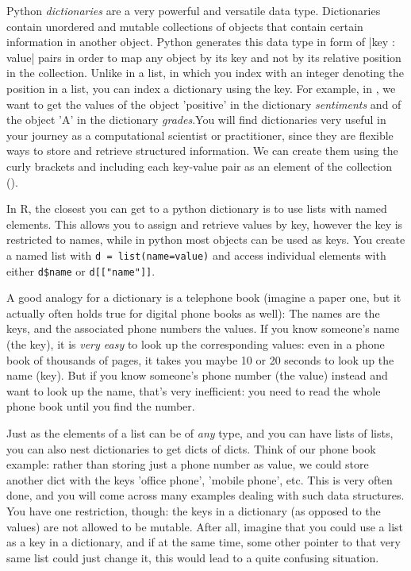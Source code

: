 Python \emph{dictionaries} are a very powerful and versatile data type.
Dictionaries contain unordered and mutable collections of objects that
contain certain information in another object. Python generates this
data type in form of |{key : value}| pairs in order
to map any object by its key and not by its relative position in the
collection. Unlike in a list, in which you index with an integer denoting
the position in a list, you can index a dictionary using the key.
For example, in , we want to get the values of the object 'positive' in the
dictionary \emph{sentiments} and of the object 'A' in the dictionary
\emph{grades}.You will
find dictionaries very useful in your journey as a computational
scientist or practitioner, since they are flexible ways to store and
retrieve structured information. We can create them using the curly
brackets {} and including each key-value pair as an element of the
collection ().

In R, the closest you can get to a python dictionary is to use lists with named elements.
This allows you to assign and retrieve values by key,
however the key is restricted to names, while in python most objects can be used as keys.
You create a named list with \verb|d = list(name=value)| and access individual elements with either
\verb|d$name| or \verb|d[["name"]]|. 


A good analogy for a dictionary is a telephone book (imagine a paper
one, but it actually often holds true for digital phone books as
well): The names are the keys, and the associated phone numbers the
values. If you know someone's name (the key), it is \emph{very easy}
to look up the corresponding values: even in a phone book of thousands
of pages, it takes you maybe 10 or 20 seconds to look up the name
(key). But if you know someone's phone number (the value) instead and
want to look up the name, that's very inefficient: you need to read
the whole phone book until you find the number.

Just as the elements of a list can be of \emph{any} type, and you can
have lists of lists, you can also nest dictionaries to get dicts of
dicts. Think of our phone book example: rather than storing just a
phone number as value, we could store another dict with the keys
'office phone', 'mobile phone', etc. This is very often done, and you
will come across many examples dealing with such data structures.
You have one restriction, though: the keys in a dictionary (as opposed
to the values) are not allowed to be mutable. After all, imagine that
you could use a list as a key in a dictionary, and if at the same time,
some other pointer to that very same list could just change it, this
would lead to a quite confusing situation.




